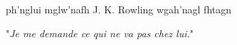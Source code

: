 ph’nglui mglw’nafh J. K. Rowling wgah’nagl fhtagn


"\emph{Je me demande ce qui ne va pas chez \emph{lui}.}"


